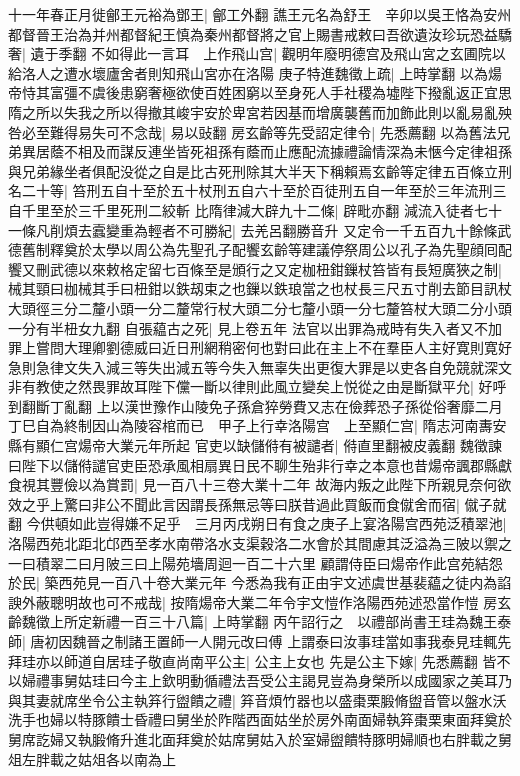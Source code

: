 十一年春正月徙鄶王元裕為鄧王|{
	鄶工外翻}
譙王元名為舒王　辛卯以吳王恪為安州都督晉王治為并州都督紀王慎為秦州都督將之官上賜書戒敕曰吾欲遺汝珍玩恐益驕奢|{
	遺于季翻}
不如得此一言耳　上作飛山宫|{
	觀明年廢明德宫及飛山宮之玄圃院以給洛人之遭水壞廬舍者則知飛山宮亦在洛陽}
庚子特進魏徵上疏|{
	上時掌翻}
以為煬帝恃其富彊不虞後患窮奢極欲使百姓困窮以至身死人手社稷為墟陛下撥亂返正宜思隋之所以失我之所以得撤其峻宇安於卑宮若因基而增廣襲舊而加飾此則以亂易亂殃咎必至難得易失可不念哉|{
	易以䜴翻}
房玄齡等先受詔定律令|{
	先悉薦翻}
以為舊法兄弟異居蔭不相及而謀反連坐皆死祖孫有蔭而止應配流據禮論情深為未愜今定律祖孫與兄弟緣坐者俱配没從之自是比古死刑除其大半天下稱賴焉玄齡等定律五百條立刑名二十等|{
	笞刑五自十至於五十杖刑五自六十至於百徒刑五自一年至於三年流刑三自千里至於三千里死刑二絞斬}
比隋律減大辟九十二條|{
	辟毗亦翻}
減流入徒者七十一條凡削煩去蠧變重為輕者不可勝紀|{
	去羌呂翻勝音升}
又定令一千五百九十餘條武德舊制釋奠於太學以周公為先聖孔子配饗玄齡等建議停祭周公以孔子為先聖顔囘配饗又刪武德以來敕格定留七百條至是頒行之又定枷杻鉗鏁杖笞皆有長短廣狹之制|{
	械其頸曰枷械其手曰杻鉗以鉄刼束之也鏁以鉄琅當之也杖長三尺五寸削去節目訊杖大頭徑三分二釐小頭一分二釐常行杖大頭二分七釐小頭一分七釐笞杖大頭二分小頭一分有半杻女九翻}
自張藴古之死|{
	見上卷五年}
法官以出罪為戒時有失入者又不加罪上嘗問大理卿劉德威曰近日刑網稍密何也對曰此在主上不在羣臣人主好寛則寛好急則急律文失入減三等失出減五等今失入無辜失出更復大罪是以吏各自免競就深文非有教使之然畏罪故耳陛下儻一斷以律則此風立變矣上悦從之由是斷獄平允|{
	好呼到翻斷丁亂翻}
上以漢世豫作山陵免子孫倉猝勞費又志在儉葬恐子孫從俗奢靡二月丁巳自為終制因山為陵容棺而已　甲子上行幸洛陽宫　上至顯仁宫|{
	隋志河南夀安縣有顯仁宫煬帝大業元年所起}
官吏以缺儲偫有被譴者|{
	偫直里翻被皮義翻}
魏徵諫曰陛下以儲偫譴官吏臣恐承風相扇異日民不聊生殆非行幸之本意也昔煬帝諷郡縣獻食視其豐儉以為賞罰|{
	見一百八十三卷大業十二年}
故海内叛之此陛下所親見奈何欲效之乎上驚曰非公不聞此言因謂長孫無忌等曰朕昔過此買飯而食僦舍而宿|{
	僦子就翻}
今供頓如此豈得嫌不足乎　三月丙戌朔日有食之庚子上宴洛陽宫西苑泛積翠池|{
	洛陽西苑北距北邙西至孝水南帶洛水支渠穀洛二水會於其間慮其泛溢為三陂以禦之一曰積翠二曰月陂三曰上陽苑墻周迴一百二十六里}
顧謂侍臣曰煬帝作此宫苑結怨於民|{
	築西苑見一百八十卷大業元年}
今悉為我有正由宇文述虞世基裴藴之徒内為諂諛外蔽聰明故也可不戒哉|{
	按隋煬帝大業二年令宇文愷作洛陽西苑述恐當作愷}
房玄齡魏徵上所定新禮一百三十八篇|{
	上時掌翻}
丙午詔行之　以禮部尚書王珪為魏王泰師|{
	唐初因魏晉之制諸王置師一人開元改曰傅}
上謂泰曰汝事珪當如事我泰見珪輒先拜珪亦以師道自居珪子敬直尚南平公主|{
	公主上女也}
先是公主下嫁|{
	先悉薦翻}
皆不以婦禮事舅姑珪曰今主上欽明動循禮法吾受公主謁見豈為身榮所以成國家之美耳乃與其妻就席坐令公主執笲行盥饋之禮|{
	笲音煩竹器也以盛棗栗腶脩盥音管以盤水沃洗手也婦以特豚饋士昏禮曰舅坐於阼階西面姑坐於房外南面婦執笲棗栗東面拜奠於舅席訖婦又執腶脩升進北面拜奠於姑席舅姑入於室婦盥饋特豚明婦順也右胖載之舅俎左胖載之姑俎各以南為上}
